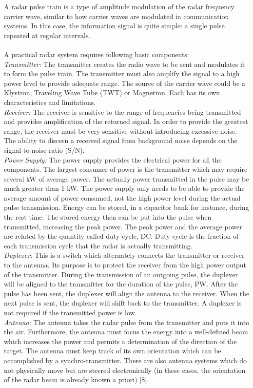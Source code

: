 \documentclass[a4paper,12pt]{report}
\begin{document}
A radar pulse train is a type of amplitude modulation of the radar frequency  
carrier wave, similar to how carrier waves are modulated in communication systems.  
In this case, the information signal is quite simple:  a single pulse repeated at 
regular intervals.\\\\
A practical radar system requires following basic components:\\
\textit{Transmitter:} The transmitter creates the radio wave to be sent and modulates it to form the pulse train.  The transmitter must also amplify the signal to a high power level to provide adequate range.  The source of the carrier wave could be a Klystron, Traveling Wave Tube (TWT) or Magnetron.  Each has its own characteristics and limitations.\\
\textit{Receiver:} The receiver is sensitive to the range of frequencies being transmitted and provides amplification of the returned signal. In order to provide the greatest range, the receiver must be very sensitive without introducing excessive noise.  The ability to discern a received signal from background noise depends on the signal-to-noise ratio (S/N).\\ 
\textit{Power Supply:} The power supply provides the electrical power for all the components.  The largest consumer of power is the transmitter which may require several kW of average power.  The actually power transmitted in the pulse may be much greater than 1 kW.  The power supply only needs to be able to provide the average amount of power consumed, not the high power level during the actual 
pulse transmission.  Energy can be stored, in a capacitor bank for instance, during the rest time.  The stored energy then can be put into the pulse when transmitted, increasing the peak power.  The peak power and the average power are related by the quantity called duty cycle, DC.  Duty cycle is the fraction of each transmission cycle that the radar is actually transmitting.\\
\textit{Duplexer:} This is a switch which alternately connects the transmitter or receiver to the antenna. Its purpose is to protect the receiver from the high power output of the transmitter. During the transmission of an outgoing pulse, the duplexer will be aligned to the transmitter for the duration of the pulse, PW. After the pulse has been sent, the duplexer will align the antenna to the receiver. When the next pulse is sent, the duplexer will shift back to the transmitter. A duplexer is not required if the transmitted power is low.\\
\textit{Antenna:} The antenna takes the radar pulse from the transmitter and puts it into the air. Furthermore, the antenna must focus the energy into a well-defined beam which increases the power and permits a determination of the direction of the target. The antenna must keep track of its own orientation which can be accomplished by a synchro-transmitter. There are also antenna systems which do not physically move but are steered electronically (in these cases, the orientation of the radar beam is already known a priori) [8]. 
\end{document}
